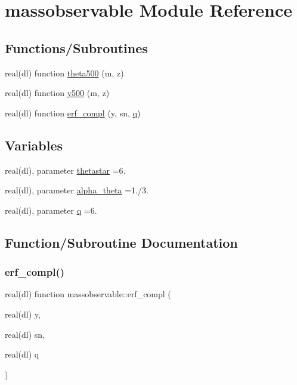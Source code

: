 \hypertarget{namespacemassobservable}{}\section{massobservable Module Reference}
\label{namespacemassobservable}
\subsection*{Functions/\+Subroutines}
\begin{DoxyCompactItemize}
\item 
real(dl) function \mbox{\hyperlink{namespacemassobservable_a4be614d859b3c2e06a7674a7af153ff5}{theta500}} (m, z)
\item 
real(dl) function \mbox{\hyperlink{namespacemassobservable_a4eca145d43dd43892e21b73f42ace63e}{y500}} (m, z)
\item 
real(dl) function \mbox{\hyperlink{namespacemassobservable_ac95513e74fbf07c2becffe8985dfc31b}{erf\+\_\+compl}} (y, sn, \mbox{\hyperlink{namespacemassobservable_adc6186979c0880b189270b9d6fa1f933}{q}})
\end{DoxyCompactItemize}
\subsection*{Variables}
\begin{DoxyCompactItemize}
\item 
real(dl), parameter \mbox{\hyperlink{namespacemassobservable_ad190951c647b00dc7f3cd907426e73df}{thetastar}} =6.
\item 
real(dl), parameter \mbox{\hyperlink{namespacemassobservable_a5a2fa41bd7c65ad6bcb80c5a33cb9b2a}{alpha\+\_\+theta}} =1./3.
\item 
real(dl), parameter \mbox{\hyperlink{namespacemassobservable_adc6186979c0880b189270b9d6fa1f933}{q}} =6.
\end{DoxyCompactItemize}


\subsection{Function/\+Subroutine Documentation}
\mbox{\label{namespacemassobservable_ac95513e74fbf07c2becffe8985dfc31b}} 
\subsubsection{\texorpdfstring{erf\+\_\+compl()}{erf\_compl()}}
{\footnotesize\ttfamily real(dl) function massobservable\+::erf\+\_\+compl (\begin{DoxyParamCaption}\item[{real(dl)}]{y,  }\item[{real(dl)}]{sn,  }\item[{real(dl)}]{q }\end{DoxyParamCaption})}



